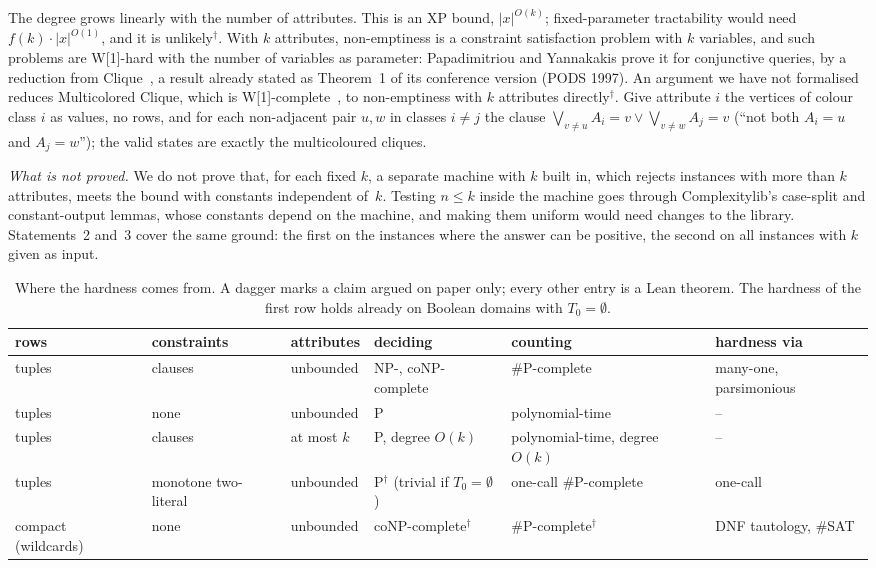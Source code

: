 \documentclass[pdflatex,sn-mathphys-num]{sn-jnl}
\theoremstyle{thmstyleone}
\theoremstyle{thmstylethree}
\newcommand{\informal}{\ensuremath{^{\dagger}}}
\begin{document}
The degree grows linearly with the number of attributes. This is an XP bound, $|x|^{O(k)}$;
fixed-parameter tractability would need $f(k) \cdot |x|^{O(1)}$, and it is unlikely\informal.
With $k$ attributes, non-emptiness is a constraint satisfaction problem with $k$ variables,
and such problems are W[1]-hard with the number of variables as parameter: Papadimitriou and
Yannakakis prove it for conjunctive queries, by a reduction from Clique~\cite{PapadimitriouYannakakis1999}, a result already stated as Theorem~1 of its
conference version (PODS 1997). An argument we have not formalised reduces Multicolored Clique, which is
W[1]-complete~\cite[Theorem~13.25]{CyganEtAl2015}, to non-emptiness with $k$ attributes
directly\informal. Give attribute $i$ the vertices of colour class $i$ as values, no rows, and
for each non-adjacent pair $u, w$ in classes $i \ne j$ the clause
$\bigvee_{v \ne u} A_i = v \lor \bigvee_{v \ne w} A_j = v$ (``not both $A_i = u$ and
$A_j = w$''); the valid states are exactly the multicoloured cliques.

\emph{What is not proved.} We do not prove that, for each fixed $k$, a separate machine with $k$
built in, which rejects instances with more than $k$ attributes, meets the bound with constants
independent of~$k$.
Testing $n \le k$ inside the machine goes through Complexitylib's case-split and
constant-output lemmas, whose constants depend on the machine, and making them uniform would
need changes to the library. Statements~2 and~3 cover the same ground: the first on the
instances where the answer can be positive, the second on all instances with $k$ given as
input.

\begin{table}[t]
\caption{Where the hardness comes from. A dagger marks a claim argued on paper only; every
other entry is a Lean theorem. The hardness of the first row holds already on Boolean domains
with $T_0 = \emptyset$.}
\label{tab:boundary}
\centering\small
\setlength{\tabcolsep}{5pt}%
\begin{tabular}{L{0.11\textwidth}L{0.13\textwidth}L{0.12\textwidth}L{0.15\textwidth}L{0.16\textwidth}L{0.14\textwidth}}
\hline
rows & constraints & attributes & deciding & counting & hardness via \\
\hline
tuples & clauses & unbounded & NP-, coNP-complete & \#P-complete & many-one, parsimonious \\
tuples & none & unbounded & P & polynomial-time & -- \\
tuples & clauses & at most $k$ & P, degree $O(k)$ & polynomial-time, degree $O(k)$ & -- \\
tuples & monotone two-literal & unbounded & P\informal{} (trivial if $T_0 = \emptyset$) & one-call \#P-complete & one-call \\
compact (wildcards) & none & unbounded & coNP-complete\informal & \#P-complete\informal & DNF tautology, \#SAT \\
\hline
\end{tabular}
\end{table}
\end{document}
